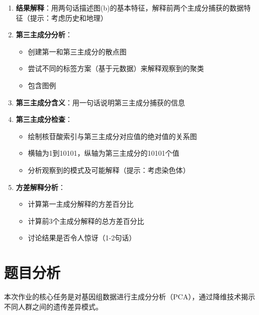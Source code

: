 \documentclass[a4paper]{article}
\begin{document}
{\begin{itemize}
\begin{enumerate}
\begin{itemize}
            \item 995个点，每个点代表一个个体在前两个主成分上的投影
            \item 不同人群使用不同颜色，包含图例
        \end{itemize}
        \item[(c)] \textbf{结果解释}：用两句话描述图(b)的基本特征，解释前两个主成分捕获的数据特征（提示：考虑历史和地理）
        \item[(d)] \textbf{第三主成分分析}：
        \begin{itemize}
            \item 创建第一和第三主成分的散点图
            \item 尝试不同的标签方案（基于元数据）来解释观察到的聚类
            \item 包含图例
        \end{itemize}
        \item[(e)] \textbf{第三主成分含义}：用一句话说明第三主成分捕获的信息
        \item[(f)] \textbf{第三主成分检查}：
        \begin{itemize}
            \item 绘制核苷酸索引与第三主成分对应值的绝对值的关系图
            \item 横轴为1到10101，纵轴为第三主成分的10101个值
            \item 分析观察到的模式及可能解释（提示：考虑染色体）
        \end{itemize}
        \item[(g)] \textbf{方差解释分析}：
        \begin{itemize}
            \item 计算第一主成分解释的方差百分比
            \item 计算前3个主成分解释的总方差百分比
            \item 讨论结果是否令人惊讶（1-2句话）
        \end{itemize}
    \end{enumerate}
\end{itemize}
}

\section{题目分析}

本次作业的核心任务是对基因组数据进行主成分分析（PCA），通过降维技术揭示不同人群之间的遗传差异模式。
\end{document}
